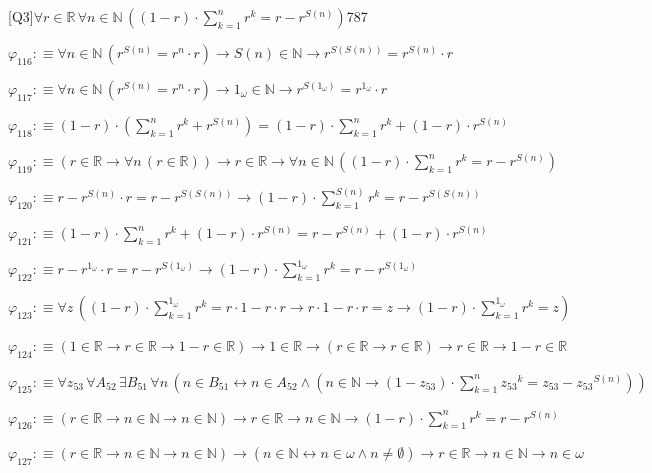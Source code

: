 \begin{fullproof}{[Q3]}{$\forall r \in \mathbb{R}\,\forall n \in \mathbb{N}\,((1 - r) \cdot {\textstyle\sum_{k=1}^{n} {{r}^{k}}} = r - {{r}^{S(n)}})$}{787}
\begin{abbrevlist}
\item $\varphi_{116} :\equiv \forall n \in \mathbb{N}\,({{r}^{S(n)}} = {{r}^{n}} \cdot r) \to S(n) \in \mathbb{N} \to {{r}^{S(S(n))}} = {{r}^{S(n)}} \cdot r$
\item $\varphi_{117} :\equiv \forall n \in \mathbb{N}\,({{r}^{S(n)}} = {{r}^{n}} \cdot r) \to 1_{\omega} \in \mathbb{N} \to {{r}^{S(1_{\omega})}} = {{r}^{1_{\omega}}} \cdot r$
\item $\varphi_{118} :\equiv (1 - r) \cdot ({\textstyle\sum_{k=1}^{n} {{r}^{k}}} + {{r}^{S(n)}}) = (1 - r) \cdot {\textstyle\sum_{k=1}^{n} {{r}^{k}}} + (1 - r) \cdot {{r}^{S(n)}}$
\item $\varphi_{119} :\equiv (r \in \mathbb{R} \to \forall n\,(r \in \mathbb{R})) \to r \in \mathbb{R} \to \forall n \in \mathbb{N}\,((1 - r) \cdot {\textstyle\sum_{k=1}^{n} {{r}^{k}}} = r - {{r}^{S(n)}})$
\item $\varphi_{120} :\equiv r - {{r}^{S(n)}} \cdot r = r - {{r}^{S(S(n))}} \to (1 - r) \cdot {\textstyle\sum_{k=1}^{S(n)} {{r}^{k}}} = r - {{r}^{S(S(n))}}$
\item $\varphi_{121} :\equiv (1 - r) \cdot {\textstyle\sum_{k=1}^{n} {{r}^{k}}} + (1 - r) \cdot {{r}^{S(n)}} = r - {{r}^{S(n)}} + (1 - r) \cdot {{r}^{S(n)}}$
\item $\varphi_{122} :\equiv r - {{r}^{1_{\omega}}} \cdot r = r - {{r}^{S(1_{\omega})}} \to (1 - r) \cdot {\textstyle\sum_{k=1}^{1_{\omega}} {{r}^{k}}} = r - {{r}^{S(1_{\omega})}}$
\item $\varphi_{123} :\equiv \forall z\,((1 - r) \cdot {\textstyle\sum_{k=1}^{1_{\omega}} {{r}^{k}}} = r \cdot 1 - r \cdot r \to r \cdot 1 - r \cdot r = z \to (1 - r) \cdot {\textstyle\sum_{k=1}^{1_{\omega}} {{r}^{k}}} = z)$
\item $\varphi_{124} :\equiv (1 \in \mathbb{R} \to r \in \mathbb{R} \to 1 - r \in \mathbb{R}) \to 1 \in \mathbb{R} \to (r \in \mathbb{R} \to r \in \mathbb{R}) \to r \in \mathbb{R} \to 1 - r \in \mathbb{R}$
\item $\varphi_{125} :\equiv \forall z_{53}\,\forall A_{52}\,\exists B_{51}\,\forall n\,(n \in B_{51} \leftrightarrow n \in A_{52} \land (n \in \mathbb{N} \to (1 - z_{53}) \cdot {\textstyle\sum_{k=1}^{n} {{z_{53}}^{k}}} = z_{53} - {{z_{53}}^{S(n)}}))$
\item $\varphi_{126} :\equiv (r \in \mathbb{R} \to n \in \mathbb{N} \to n \in \mathbb{N}) \to r \in \mathbb{R} \to n \in \mathbb{N} \to (1 - r) \cdot {\textstyle\sum_{k=1}^{n} {{r}^{k}}} = r - {{r}^{S(n)}}$
\item $\varphi_{127} :\equiv (r \in \mathbb{R} \to n \in \mathbb{N} \to n \in \mathbb{N}) \to (n \in \mathbb{N} \leftrightarrow n \in \omega \land n \neq \emptyset) \to r \in \mathbb{R} \to n \in \mathbb{N} \to n \in \omega$

\end{abbrevlist}
\end{fullproof}
